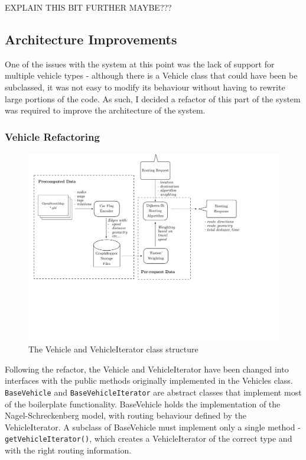 \documentclass[ %
                    author={Alexander Hill},
                supervisor={Dr. Benjamin Sach},
                    degree={MEng},
                     title={MARMOSET},
                  subtitle={Multi-Agent Route Management using Online Simulation for Efficient Transportation},
                      type={research},
                      year={2016} ]{dissertation}
\begin{document}
EXPLAIN THIS BIT FURTHER MAYBE???

\subsection{Architecture Improvements}

One of the issues with the system at this point was the lack of support for
multiple vehicle types - although there is a Vehicle class that could have been
be subclassed, it was not easy to modify its behaviour without having to rewrite
large portions of the code.  As such, I decided a refactor of this part of the
system was required to improve the architecture of the system.

\subsubsection{Vehicle Refactoring}

\begin{figure}[h]
    \centering
    \includegraphics[scale=0.6,page=6,clip,trim=0 11cm 8cm 0]{architecture}
    \caption{The Vehicle and VehicleIterator class structure}\label{fig:veh-arch}
\end{figure}

Following the refactor, the Vehicle and VehicleIterator have been changed into
interfaces with the public methods originally implemented in the Vehicles class.
\texttt{BaseVehicle} and \texttt{BaseVehicleIterator} are abstract classes that
implement most of the boilerplate functionality. BaseVehicle holds the
implementation of the Nagel-Schreckenberg model, with routing behaviour defined
by the VehicleIterator. A subclass of BaseVehicle must implement only a single
method - \texttt{getVehicleIterator()}, which creates a VehicleIterator of the
correct type and with the right routing information.
\end{document}
